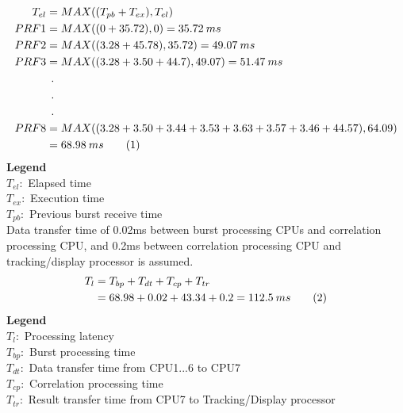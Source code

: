 \begin{align*}
	T_{el} &= MAX((T_{pb} + T_{ex}), T_{el})\\
	PRF1 &= MAX((0 + 35.72), 0) = 35.72 \: ms\\
	PRF2 &= MAX((3.28 + 45.78), 35.72) = 49.07 \: ms \\	 
	PRF3 &= MAX((3.28 + 3.50 + 44.7),49.07) = 51.47 \: ms \\
		& \: \: . \\
		& \: \: . \\
		& \: \: . \\	
	PRF8 &= MAX((3.28 + 3.50 + 3.44 + 3.53 + 3.63 + 3.57 + 3.46 + 44.57), 64.09) \\
		&= 68.98 \: ms	\stepcounter{equation}\tag{\theequation}
\end{align*}
\noindent 
\textbf{Legend}\\
\tab $T_{el}:$ Elapsed time \\
\tab $T_{ex}:$ Execution time \\
\tab $T_{pb}:$ Previous burst receive time\\


Data transfer time of 0.02ms between burst processing CPUs and correlation processing CPU, and 0.2ms between correlation processing CPU and tracking/display processor is assumed.
\begin{align*}
	T_{l} &= T_{bp} + T_{dt} + T_{cp} + T_{tr}  \\
		&= 68.98 + 0.02 + 43.34 + 0.2 = 112.5 \: ms  \stepcounter{equation}\tag{\theequation}
\end{align*}
\noindent 
\textbf{Legend}\\
\tab $T_{l}:$ Processing latency \\
\tab $T_{bp}:$ Burst processing time \\
\tab $T_{dt}:$ Data transfer time from CPU1...6 to CPU7\\
\tab $T_{cp}:$ Correlation processing time \\
\tab $T_{tr}:$ Result transfer time from CPU7 to Tracking/Display processor \\

